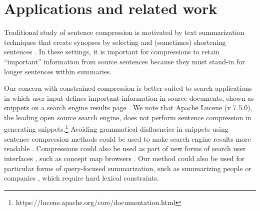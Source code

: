 \documentclass[11pt,a4paper]{article}
\newcommand{\ahcomment}[1]{\textcolor{blue}{[#1 -AH]}}
\begin{document}

\section{Applications and related work}

Traditional study of sentence compression is motivated by text summarization techniques that create synopses by selecting and (sometimes) shortening sentences \cite{Knight2000StatisticsBasedS,vanderwende2007beyond,martins2009summarization}. 
In these settings, it is important for compressions to retain ``important'' information from source sentences because they must stand-in for longer sentences within summaries.

Our concern with constrained compression is better suited to search applications in which user input defines important information in source documents, shown as snippets on a search engine results page \cite{tombros1998advantages,Metzler2008MachineLS}. %
We note that Apache Lucene {\small (v 7.5.0)}, the leading open source search engine, does not perform sentence compression in generating snippets.\footnote{https://lucene.apache.org/core/documentation.html} Avoiding grammatical disfluencies in snippets using sentence compression methods could be used to make search engine results more readable \cite{kanungo2009predicting}. Compressions could also be used as part of new forms of search user interfaces \cite{hearst2009search}, such as concept map browsers \cite{falke2017graphdocexplore}. Our method could also be used for particular forms of query-focused summarization, such as summarizing people \cite{w04} or companies \cite{filippova2009company}, which require hard lexical constraints. 
\end{document}
